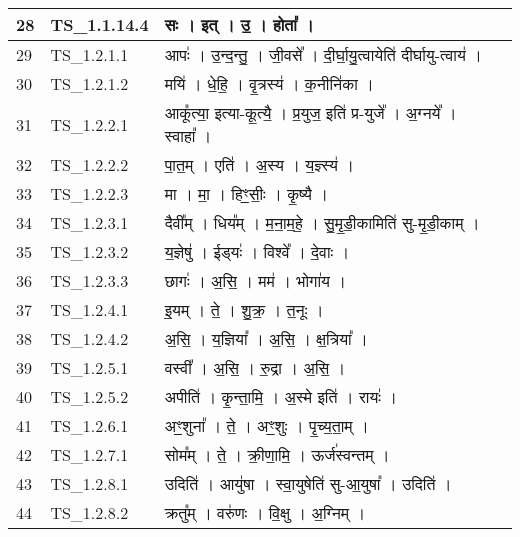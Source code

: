 \documentclass[17pt]{extarticle}
\begin{document}
\begin{longtable}{||p{0.4in}||p{0.9in}||p{4.0in}||p{0.9in}||}
        \hline
            28 & TS\_1.1.14.4 & सः   ।   इत्   ।   उ॒   ।   होता᳚   ।    &      \\
        \hline
            29 & TS\_1.2.1.1 & आपः॑   ।   उ॒न्द॒न्तु॒   ।   जी॒वसे᳚   ।   दी॒र्घा॒यु॒त्वायेति॑ दीर्घायु{-}त्वाय॑   ।    &      \\
        \hline
            30 & TS\_1.2.1.2 & मयि॑   ।   धे॒हि॒   ।   वृ॒त्रस्य॑   ।   क॒नीनि॑का   ।    &      \\
        \hline
            31 & TS\_1.2.2.1 & आकू᳚त्या॒ इत्या{-}कू॒त्यै॒   ।   प्र॒युज॒ इति॑ प्र{-}युजे᳚   ।   अ॒ग्नये᳚   ।   स्वाहा᳚   ।    &      \\
        \hline
            32 & TS\_1.2.2.2 & पा॒त॒म्   ।   एति॑   ।   अ॒स्य   ।   य॒ज्ञ्स्य॑   ।    &      \\
        \hline
            33 & TS\_1.2.2.3 & मा   ।   मा॒   ।   हिꣳ॒॒सीः॒   ।   कृ॒ष्यै   ।    &      \\
        \hline
            34 & TS\_1.2.3.1 & दैवी᳚म्   ।   धिय᳚म्   ।   म॒ना॒म॒हे॒   ।   सु॒मृ॒डी॒कामिति॑ सु{-}मृ॒डी॒काम्   ।    &      \\
        \hline
            35 & TS\_1.2.3.2 & य॒ज्ञेषु॑   ।   ईड्‍यः॑   ।   विश्वे᳚   ।   दे॒वाः   ।    &      \\
        \hline
            36 & TS\_1.2.3.3 & छागः॑   ।   अ॒सि॒   ।   मम॑   ।   भोगा॑य   ।    &      \\
        \hline
            37 & TS\_1.2.4.1 & इ॒यम्   ।   ते॒   ।   शु॒क्र॒   ।   त॒नूः   ।    &      \\
        \hline
            38 & TS\_1.2.4.2 & अ॒सि॒   ।   य॒ज्ञिया᳚   ।   अ॒सि॒   ।   क्ष॒त्रिया᳚   ।    &      \\
        \hline
            39 & TS\_1.2.5.1 & वस्वी᳚   ।   अ॒सि॒   ।   रु॒द्रा   ।   अ॒सि॒   ।    &      \\
        \hline
            40 & TS\_1.2.5.2 & अपीति॑   ।   कृ॒न्ता॒मि॒   ।   अ॒स्मे इति॑   ।   रायः॑   ।    &      \\
        \hline
            41 & TS\_1.2.6.1 & अꣳ॒॒शुना᳚   ।   ते॒   ।   अꣳ॒॒शुः   ।   पृ॒च्य॒ता॒म्   ।    &      \\
        \hline
            42 & TS\_1.2.7.1 & सोम᳚म्   ।   ते॒   ।   क्री॒णा॒मि॒   ।   ऊर्ज॑स्वन्तम्   ।    &      \\
        \hline
            43 & TS\_1.2.8.1 & उदिति॑   ।   आयु॑षा   ।   स्वा॒युषेति॑ सु{-}आ॒युषा᳚   ।   उदिति॑   ।    &      \\
        \hline
            44 & TS\_1.2.8.2 & क्रतु᳚म्   ।   वरु॑णः   ।   वि॒क्षु   ।   अ॒ग्निम्   ।    &      \\

\end{longtable}
\end{document}
